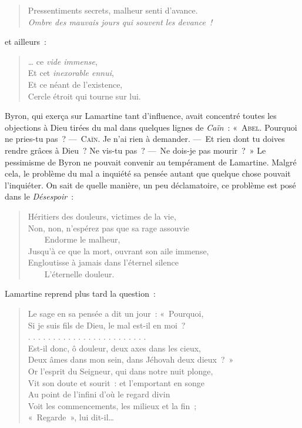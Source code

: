 \documentclass[french,twoside]{book} %
\begin{document}
\begin{verse}
Pressentiments secrets, malheur senti d’avance.\\
\emph{Ombre des mauvais jours qui souvent les devance !}\\
\end{verse}

\noindent et ailleurs :\par


\begin{verse}
… ce \emph{vide immense},\\
Et cet \emph{inexorable ennui},\\
Et ce néant de l’existence,\\
Cercle étroit qui tourne sur lui.\\
\end{verse}

\noindent Byron, qui exerça sur Lamartine tant d’influence, avait concentré toutes les objections à Dieu tirées du mal dans quelques lignes de \emph{Caïn} : « {\scshape Abel.} Pourquoi ne pries-tu pas ? — {\scshape Caïn}. Je n’ai rien à demander. — Et rien dont tu doives rendre grâces à Dieu ? Ne vis-tu pas ? — Ne dois-je pas mourir ? » Le pessimisme de Byron ne pouvait convenir au tempérament de Lamartine. Malgré cela, le problème du mal a inquiété sa pensée autant que quelque chose pouvait l’inquiéter. On sait de quelle manière, un peu déclamatoire, ce problème est posé dans le \emph{Désespoir} :\par


\begin{verse}
Héritiers des douleurs, victimes de la vie,\\
Non, non, n’espérez pas que sa rage assouvie\\
    Endorme le malheur,\\
Jusqu’à ce que la mort, ouvrant son aile immense,\\
Engloutisse à jamais dans l’éternel silence\\
    L’éternelle douleur.\\
\end{verse}

\noindent Lamartine reprend plus tard la question :\par


\begin{verse}
Le sage en sa pensée a dit un jour : « Pourquoi,\\
Si je suis fils de Dieu, le mal est-il en moi ?\\
. . . . . . . . . . . . . . . . . . . . . . . .\\
Est-il donc, ô douleur, deux axes dans les cieux,\\
Deux âmes dans mon sein, dans Jéhovah deux dieux ? »\\
Or l’esprit du Seigneur, qui dans notre nuit plonge,\\
Vit son doute et sourit : et l’emportant en songe\\
Au point de l’infini d’où le regard divin\\
Voit les commencements, les milieux et la fin ;\\
« Regarde », lui dit-il…\\
\end{verse}
\end{document}
